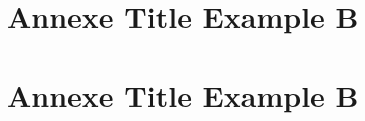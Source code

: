\appendix

\chapter[Apendice A]{Annexe Title Example B}


\chapter[Apendice B]{Annexe Title Example B}
